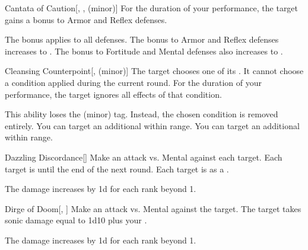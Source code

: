 {\begin{freeability}{Cantata of Caution}[, ,  (minor)]
                For the duration of your performance, the target gains a  bonus to Armor and Reflex defenses.

                \rankline
                 The bonus applies to all defenses.
                 The bonus to Armor and Reflex defenses increases to .
                 The bonus to Fortitude and Mental defenses also increases to .
            \end{freeability}

            \begin{freeability}{Cleansing Counterpoint}[,  (minor)]
                The target chooses one of its .
                It cannot choose a condition applied during the current round.
                For the duration of your performance, the target ignores all effects of that condition.

                \rankline
                 This ability loses the  (minor) tag.
                    Instead, the chosen condition is removed entirely.
                 You can target an additional  within range.
                 You can target an additional  within range.
            \end{freeability}

            \begin{freeability}{Dazzling Discordance}[]
                Make an attack vs. Mental against each target.
                \hit Each target is  until the end of the next round.
                \crit Each target is  as a .

                \rankline
                The damage increases by \plus1d for each rank beyond 1.
            \end{freeability}

            \begin{freeability}{Dirge of Doom}[, ]
                Make an attack vs. Mental against the target.
                \hit The target takes sonic damage equal to 1d10 plus your .

                \rankline
                The damage increases by \plus1d for each rank beyond 1.
            \end{freeability}

}
